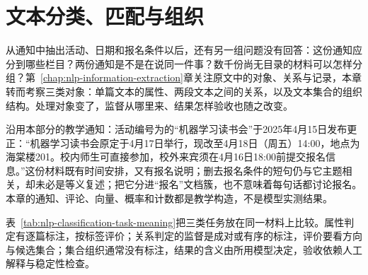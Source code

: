 \chapter{文本分类、匹配与组织}
\label{chap:nlp-classification-matching-organization}

从通知中抽出活动、日期和报名条件以后，还有另一组问题没有回答：这份通知应分到哪些栏目？两份通知是不是在说同一件事？数千份尚无目录的材料可以怎样分组？第~\ref{chap:nlp-information-extraction}章关注原文中的对象、关系与记录，本章转而考察三类对象：单篇文本的属性、两段文本之间的关系，以及文本集合的组织结构。处理对象变了，监督从哪里来、结果怎样验收也随之改变。

沿用本部分的教学通知：活动编号为的“机器学习读书会”于2025年4月15日发布更正：“机器学习读书会原定于4月17日举行，现改至4月18日（周五）14:00，地点为海棠楼201。校内师生可直接参加，校外来宾须在4月16日18:00前提交报名信息。”这份材料既有时间安排，又有报名说明；删去报名条件的短句仍与它主题相关，却未必是等义复述；把它分进“报名”文档簇，也不意味着每句话都讨论报名。本章的通知、评论、向量、概率和计数都是教学构造，不是模型实测结果。

表~\ref{tab:nlp-classification-task-meaning}把三类任务放在同一材料上比较。属性判定有逐篇标注，按标签评价；关系判定的监督是成对或有序的标注，评价要看方向与候选集合；集合组织通常没有标注，结果的含义由所用模型决定，验收依赖人工解释与稳定性检查。

